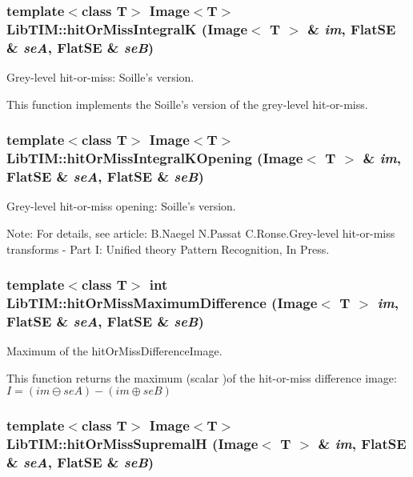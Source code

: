 \subsubsection{\setlength{\rightskip}{0pt plus 5cm}template$<$class T$>$ Image$<$T$>$ Lib\-TIM::hit\-Or\-Miss\-Integral\-K (Image$<$ T $>$ \& {\em im}, Flat\-SE \& {\em se\-A}, Flat\-SE \& {\em se\-B})}\label{group__interval_ga2}


Grey-level hit-or-miss: Soille's version. 

This function implements the Soille's version of the grey-level hit-or-miss.
\subsubsection{\setlength{\rightskip}{0pt plus 5cm}template$<$class T$>$ Image$<$T$>$ Lib\-TIM::hit\-Or\-Miss\-Integral\-KOpening (Image$<$ T $>$ \& {\em im}, Flat\-SE \& {\em se\-A}, Flat\-SE \& {\em se\-B})}\label{group__interval_ga5}


Grey-level hit-or-miss opening: Soille's version. 

\begin{Desc}
\item[Note:]For details, see article: B.Naegel N.Passat C.Ronse.Grey-level hit-or-miss transforms - Part I: Unified theory Pattern Recognition, In Press.\end{Desc}
\subsubsection{\setlength{\rightskip}{0pt plus 5cm}template$<$class T$>$ int Lib\-TIM::hit\-Or\-Miss\-Maximum\-Difference (Image$<$ T $>$ {\em im}, Flat\-SE \& {\em se\-A}, Flat\-SE \& {\em se\-B})}\label{group__interval_ga1}


Maximum of the hit\-Or\-Miss\-Difference\-Image. 

This function returns the maximum (scalar )of the hit-or-miss difference image: $I=(im\ominus seA)-(im\oplus seB) $
\subsubsection{\setlength{\rightskip}{0pt plus 5cm}template$<$class T$>$ Image$<$T$>$ Lib\-TIM::hit\-Or\-Miss\-Supremal\-H (Image$<$ T $>$ \& {\em im}, Flat\-SE \& {\em se\-A}, Flat\-SE \& {\em se\-B})}\label{group__interval_ga3}


